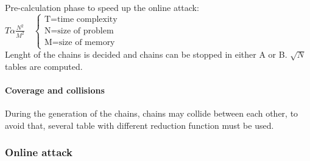 Pre-calculation phase to speed up the online attack:
$T \alpha \frac{N^2}{M^2} \quad \begin{cases}
    \textrm{T=time complexity}\\
    \textrm{N=size of problem}\\
    \textrm{M=size of memory}
    \end{cases}$\\
Lenght of the chains is decided and chains can be stopped in either A or B.
$\sqrt{N}$ tables are computed.

\paragraph{Coverage and collisions}

During the generation of the chains, chains may collide between each other, to
avoid that, several table with different reduction function must be used.

\subsubsection{Online attack}

